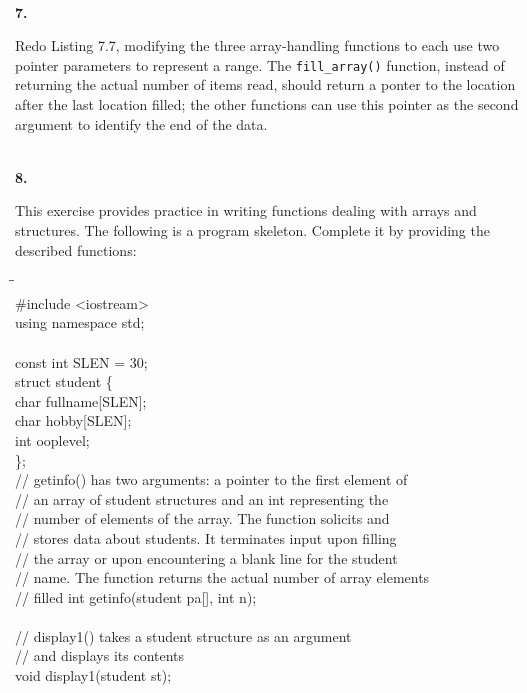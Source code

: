 \documentclass[10 pt]{amsart}
\newlength{\cwidth}
\newenvironment{cpart}[2][\cwidth]
	{\\ \phantom{\qquad}\textbf{#2. }\begin{minipage}[t]{#1}}
	{\end{minipage}}
\newcommand{\ttt}[1]{\texttt{#1}}
\begin{document}
	\begin{cpart}{7}
		Redo Listing 7.7, modifying the three array-handling functions
		to each use two pointer parameters to represent a range.
		The \ttt{fill\_array()} function, instead of returning the 
		actual number of items read, should return a ponter to the
		location after the last location filled;
		the other functions can use this pointer as the second argument
		to identify the end of the data.
	\end{cpart}
	\vspace{2ex}

	\begin{cpart}{8}
		This exercise provides practice in writing functions dealing
		with arrays and structures.
		The following is a program skeleton.
		Complete it by providing the described functions:
		{\ttfamily
			\begin{tabbing}
				\phantom{\qquad}\=\phantom{\qquad}\=\phantom{\qquad}\= \\
				\#include <iostream> \\
				using namespace std; \\
				\\
				const int SLEN = 30; \\
				struct student \{ \\
				\>	char fullname[SLEN]; \\
				\> char hobby[SLEN]; \\
				\> int ooplevel; \\
				\}; \\
				// getinfo() has two arguments: a pointer to the first element
				of \\
				// an array of student structures and an int representing
				the \\
				// number of elements of the array. The function solicits
				and \\
				// stores data about students. It terminates input
				upon filling \\
				// the array or upon encountering a blank line for
				the student \\
				// name. The function returns the actual number of 
				array elements \\
				// filled
				int getinfo(student pa[], int n); \\
				\\
				// display1() takes a student structure as an argument \\
				// and displays its contents \\
				void display1(student st); \\

\end{tabbing}}
\end{cpart}
\end{document}
